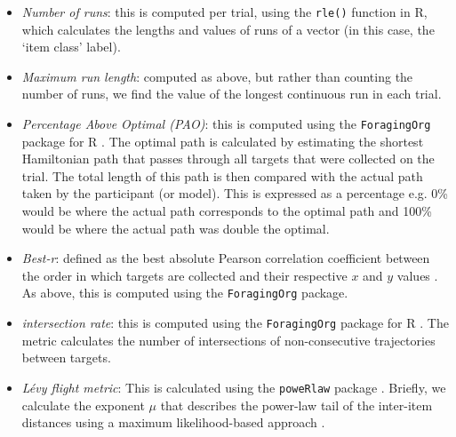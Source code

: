 \documentclass[man, floatsintext]{apa7}
\begin{document}
\begin{itemize}

   \item \textit{Number of runs}: this is computed per trial, using the \texttt{rle()} function in R, which calculates the lengths and values of runs of a vector (in this case, the `item class' label).  \\

    \item \textit{Maximum run length}: computed as above, but rather than counting the number of runs, we find the value of the longest continuous run in each trial. \\

    \item \textit{Percentage Above Optimal (PAO)}: this is computed using the \texttt{ForagingOrg} package for R \citep{olafsdottir2021}. The optimal path is calculated by estimating the shortest Hamiltonian path that passes through all targets that were collected on the trial. The total length of this path is then compared with the actual path taken by the participant (or model). This is expressed as a percentage e.g. 0\% would be where the actual path corresponds to the optimal path and 100\% would be where the actual path was double the optimal. \\

    \item \textit{Best-r}: defined as the best absolute Pearson correlation coefficient between the order in which targets are collected and their respective $x$ and $y$ values \citep{woods2013development}. As above, this is computed using the \texttt{ForagingOrg} package.  \\

    \item \textit{intersection rate}: this is computed using the \texttt{ForagingOrg} package for R \citep{olafsdottir2021}. The metric calculates the number of intersections of non-consecutive trajectories between targets.

    \item \textit{L\'evy flight metric}: This is calculated using the \texttt{poweRlaw} package \citep{clauset2009}. Briefly, we calculate the exponent $\mu$ that describes the power-law tail of the inter-item distances using a maximum likelihood-based approach \citep{edwards2008using}. \\

\end{itemize}
\end{document}
